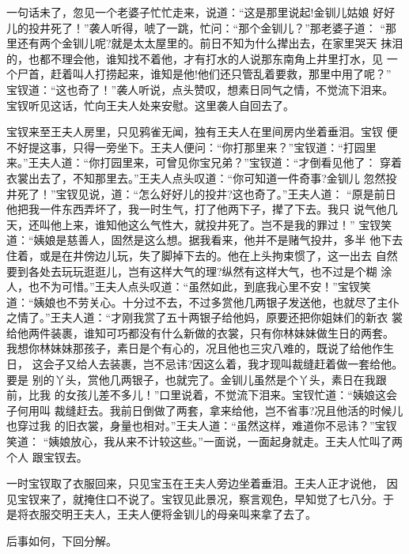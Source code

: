 一句话未了，忽见一个老婆子忙忙走来，说道：“这是那里说起!金钏儿姑娘
好好儿的投井死了！”袭人听得，唬了一跳，忙问：“那个金钏儿？”那老婆子道：
“那里还有两个金钏儿呢?就是太太屋里的。前日不知为什么撵出去，在家里哭天
抹泪的，也都不理会他，谁知找不着他，才有打水的人说那东南角上井里打水，见
一个尸首，赶着叫人打捞起来，谁知是他!他们还只管乱着要救，那里中用了呢？”
宝钗道：“这也奇了！”袭人听说，点头赞叹，想素日同气之情，不觉流下泪来。
宝钗听见这话，忙向王夫人处来安慰。这里袭人自回去了。

宝钗来至王夫人房里，只见鸦雀无闻，独有王夫人在里间房内坐着垂泪。宝钗
便不好提这事，只得一旁坐下。王夫人便问：“你打那里来？”宝钗道：“打园里
来。”王夫人道：“你打园里来，可曾见你宝兄弟？”宝钗道：“才倒看见他了：
穿着衣裳出去了，不知那里去。”王夫人点头叹道：“你可知道一件奇事?金钏儿
忽然投井死了！”宝钗见说，道：“怎么好好儿的投井?这也奇了。”王夫人道：
“原是前日他把我一件东西弄坏了，我一时生气，打了他两下子，撵了下去。我只
说气他几天，还叫他上来，谁知他这么气性大，就投井死了。岂不是我的罪过！”
宝钗笑道：“姨娘是慈善人，固然是这么想。据我看来，他并不是赌气投井，多半
他下去住着，或是在井傍边儿玩，失了脚掉下去的。他在上头拘束惯了，这一出去
自然要到各处去玩玩逛逛儿，岂有这样大气的理?纵然有这样大气，也不过是个糊
涂人，也不为可惜。”王夫人点头叹道：“虽然如此，到底我心里不安！”宝钗笑
道：“姨娘也不劳关心。十分过不去，不过多赏他几两银子发送他，也就尽了主仆
之情了。”王夫人道：“才刚我赏了五十两银子给他妈，原要还把你姐妹们的新衣
裳给他两件装裹，谁知可巧都没有什么新做的衣裳，只有你林妹妹做生日的两套。
我想你林妹妹那孩子，素日是个有心的，况且他也三灾八难的，既说了给他作生日，
这会子又给人去装裹，岂不忌讳?因这么着，我才现叫裁缝赶着做一套给他。要是
别的丫头，赏他几两银子，也就完了。金钏儿虽然是个丫头，素日在我跟前，比我
的女孩儿差不多儿！”口里说着，不觉流下泪来。宝钗忙道：“姨娘这会子何用叫
裁缝赶去。我前日倒做了两套，拿来给他，岂不省事?况且他活的时候儿也穿过我
的旧衣裳，身量也相对。”王夫人道：“虽然这样，难道你不忌讳？”宝钗笑道：
“姨娘放心，我从来不计较这些。”一面说，一面起身就走。王夫人忙叫了两个人
跟宝钗去。

一时宝钗取了衣服回来，只见宝玉在王夫人旁边坐着垂泪。王夫人正才说他，
因见宝钗来了，就掩住口不说了。宝钗见此景况，察言观色，早知觉了七八分。于
是将衣服交明王夫人，王夫人便将金钏儿的母亲叫来拿了去了。

后事如何，下回分解。
